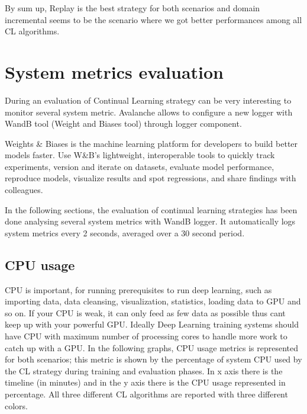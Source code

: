 \documentclass[english, LaM, oneside]{sapthesis}%
\begin{document}
By sum up, Replay is the best strategy for both scenarios and domain incremental seems to be the scenario where we got better performances among all CL algorithms.

\section{System metrics evaluation}
During an evaluation of Continual Learning strategy can be very interesting to monitor several system metric.
Avalanche allows to configure a new logger with WandB tool (Weight and Biases tool) through logger component.

Weights \& Biases is the machine learning platform for developers to build better models faster. Use W\&B's lightweight, interoperable tools to quickly track experiments, version and iterate on datasets, evaluate model performance, reproduce models, visualize results and spot regressions, and share findings with colleagues.

In the following sections, the evaluation of continual learning strategies has been done analysing several system metrics with WandB logger. It automatically logs system metrics every 2 seconds, averaged over a 30 second period.

\subsection{CPU usage}
CPU is important, for running prerequisites to run deep learning, such as importing data, data cleansing, visualization, statistics, loading data to GPU and so on.
If your CPU is weak, it can only feed as few data as possible thus cant keep up with your powerful GPU. Ideally Deep Learning training systems should have CPU with maximum number of processing cores to handle more work to catch up with a GPU.
In the following graphs, CPU usage metrics is represented for both scenarios; this metric is shown by the percentage of system CPU used by the CL strategy during training and evaluation phases.  In x axis there is the timeline (in minutes) and in the y axis there is the CPU usage represented in percentage. All three different CL algorithms are reported with three different colors.
\end{document}

